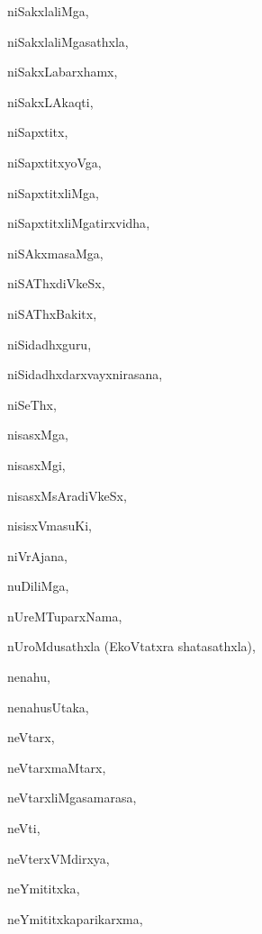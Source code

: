 \begin{multicols}{2}
{niSakxlaliMga}, \pageref{niSakxlaliMga}

{niSakxlaliMgasathxla}, \pageref{niSakxlaliMgasathxla}

{niSakxLabarxhamx}, \pageref{niSakxLabarxhamx}

{niSakxLAkaqti}, \pageref{niSakxLAkaqti}

{niSapxtitx}, \pageref{niSapxtitx}

{niSapxtitxyoVga}, \pageref{niSapxtitxyoVga}

{niSapxtitxliMga}, \pageref{niSapxtitxliMga}

{niSapxtitxliMgatirxvidha}, \pageref{niSapxtitxliMgatirxvidha}

{niSAkxmasaMga}, \pageref{niSAkxmasaMga}

{niSAThxdiVkeSx}, \pageref{niSAThxdiVkeSx}

{niSAThxBakitx}, \pageref{niSAThxBakitx}

{niSidadhxguru}, \pageref{niSidadhxguru}

{niSidadhxdarxvayxnirasana}, \pageref{niSidadhxdarxvayxnirasana}

{niSeThx}, \pageref{niSeThx}

{nisasxMga}, \pageref{nisasxMga}

{nisasxMgi}, \pageref{nisasxMgi}

{nisasxMsAradiVkeSx}, \pageref{nisasxMsAradiVkeSx}

{nisisxVmasuKi}, \pageref{nisisxVmasuKi}

{niVrAjana}, \pageref{niVrAjana}

{nuDiliMga}, \pageref{nuDiliMga}

{nUreMTuparxNama}, \pageref{nUreMTuparxNama}

{nUroMdusathxla (EkoVtatxra shatasathxla)}, \pageref{nUroMdusathxlaEkoVtatxra shatasathxla}

{nenahu}, \pageref{nenahu}

{nenahusUtaka}, \pageref{nenahusUtaka}

{neVtarx}, \pageref{neVtarx}

{neVtarxmaMtarx}, \pageref{neVtarxmaMtarx}

{neVtarxliMgasamarasa}, \pageref{neVtarxliMgasamarasa}

{neVti}, \pageref{neVti}

{neVterxVMdirxya}, \pageref{neVterxVMdirxya}

{neYmititxka}, \pageref{neYmititxka}

{neYmititxkaparikarxma}, \pageref{neYmititxkaparikarxma}


\end{multicols}
